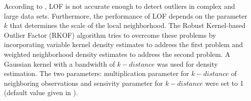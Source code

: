 \documentclass{agujournal2018}
\begin{document}
According to \citet{gao2011rkof}, LOF is not accurate enough to
detect outliers in complex and large data sets. Furthermore, the
performance of LOF depends on the parameter \(k\) that determines the
scale of the local neighborhood. The Robust Kernel-based Outlier Factor
(RKOF) algorithm \citep{gao2011rkof} tries to overcome these problems
by incorporating variable kernel density estimates to address the first
problem and weighted neighborhood density estimates to address the
second problem. \color{black} A Gaussian kernel with a bandwidth of \(k-distance\) was used for density estimation. The two parameters: multiplication parameter for \(k-distance\) of neighboring observations and sensivity parameter for \(k-distance\) were set to 1 (default value given in \citet{gao2011rkof}). \color{black}



\end{document}
